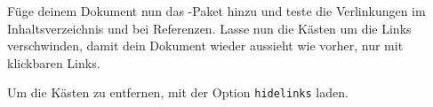 \item Füge deinem Dokument nun das -Paket hinzu und teste die Verlinkungen im Inhaltsverzeichnis und bei Referenzen. Lasse nun die Kästen um die Links verschwinden, damit dein Dokument wieder aussieht wie vorher, nur mit klickbaren Links.\label{hyperref}
\begin{loesung}
    Um die Kästen zu entfernen,  mit der Option \texttt{hidelinks} laden.
\end{loesung}